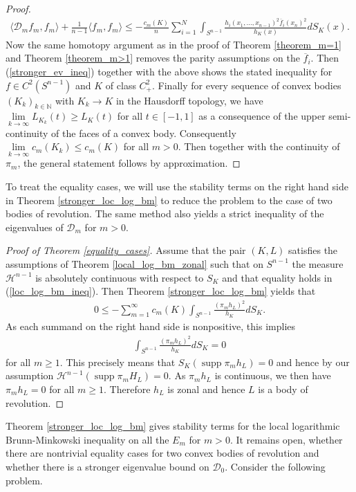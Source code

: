 \documentclass[12pt,twoside]{amsart}
\numberwithin{satz}{section}
\theoremstyle{definition}
\numberwithin{equation}{section}
\newcommand\N{\mathbb{N}}
\newcommand\supp{\operatorname{supp}}
\begin{document}
\begin{proof}
\begin{align}
			\langle \mathcal{D}_mf_m,f_m\rangle + \frac{1}{n-1}\langle f_m,f_m\rangle \leq -\frac{c_m(K)}{n}\sum_{i=1}^N \int_{S^{n-1}} \frac{h_i(x_1,\dots,x_{n-1})^2\overline{f}_i(x_n)^2}{h_K(x)}dS_K(x).
		\end{align}
		Now the same homotopy argument as in the proof of Theorem \ref{theorem_m=1} and Theorem \ref{theorem_m>1} removes the parity assumptions on the $\overline{f}_i$. Then (\ref{stronger_ev_ineq}) together with the above shows the stated inequality for $f\in C^2(S^{n-1})$ and $K$ of class $C^2_+$. Finally for every sequence of convex bodies $(K_k)_{k\in\N}$ with $K_k\to K$ in the Hausdorff topology, we have $\lim\limits_{k\to\infty} L_{K_k}(t)\geq L_K(t)$ for all $t\in[-1,1]$ as a consequence of the upper semi-continuity of the faces of a convex body. Consequently $\lim\limits_{k\to\infty}c_m(K_k)\leq c_m(K)$ for all $m>0$. Then together with the continuity of $\pi_m$, the general statement follows by approximation.
	\end{proof}
	
	To treat the equality cases, we will use the stability terms on the right hand side in Theorem \ref{stronger_loc_log_bm} to reduce the problem to the case of two bodies of revolution. The same method also yields a strict inequality of the eigenvalues of $\mathcal{D}_m$ for $m>0$. 
	
	\begin{proof}[Proof of Theorem \ref{equality_cases}]
		Assume that the pair $(K,L)$ satisfies the assumptions of Theorem \ref{local_log_bm_zonal} such that on $S^{n-1}$ the measure $\mathcal{H}^{n-1}$ is absolutely continuous with respect to $S_K$ and that equality holds in (\ref{loc_log_bm_ineq}). Then Theorem \ref{stronger_loc_log_bm} yields that
		\begin{align*}
			0\leq -\sum_{m=1}^\infty c_m(K) \int_{S^{n-1}} \frac{(\pi_mh_L)^2}{h_K}dS_K. 
		\end{align*}
		As each summand on the right hand side is nonpositive, this implies 
		\begin{align*}
			\int_{S^{n-1}} \frac{(\pi_mh_L)^2}{h_K}dS_K=0
		\end{align*}
		for all $m\geq 1$. This precisely means that $S_K(\supp \pi_mh_L)=0$ and hence by our assumption $\mathcal{H}^{n-1}(\supp \pi_mH_L)=0$. As $\pi_mh_L$ is continuous, we then have $\pi_mh_L=0$ for all $m\geq 1$. Therefore $h_L$ is zonal and hence $L$ is a body of revolution. 
	\end{proof}

	Theorem \ref{stronger_loc_log_bm} gives stability terms for the local logarithmic Brunn-Minkowski inequality on all the $E_m$ for $m>0$. It remains open, whether there are nontrivial equality cases for two convex bodies of revolution and whether there is a stronger eigenvalue bound on $\mathcal{D}_0$. Consider the following problem.
	
\end{document}
